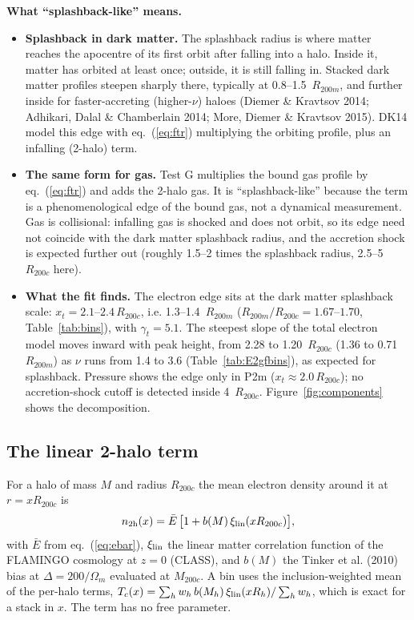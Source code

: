 \documentclass[10pt,a4paper]{article}
\newcommand{\Rc}{R_{200c}}
\newcommand{\ntwo}{n_{\rm 2h}}
\begin{document}
\textbf{What ``splashback-like'' means.}
\begin{itemize}
\item \textbf{Splashback in dark matter.} The splashback radius is where matter reaches the apocentre of its first orbit
  after falling into a halo. Inside it, matter has orbited at least once; outside, it is still falling in. Stacked dark
  matter profiles steepen sharply there, typically at 0.8--1.5~$R_{200m}$, and further inside for faster-accreting
  (higher-$\nu$) haloes (Diemer \& Kravtsov 2014; Adhikari, Dalal \& Chamberlain 2014; More, Diemer \& Kravtsov 2015).
  DK14 model this edge with eq.~(\ref{eq:ftr}) multiplying the orbiting profile, plus an infalling (2-halo) term.
\item \textbf{The same form for gas.} Test G multiplies the bound gas profile by eq.~(\ref{eq:ftr}) and adds the 2-halo gas.
  It is ``splashback-like'' because the term is a phenomenological edge of the bound gas, not a dynamical measurement.
  Gas is collisional: infalling gas is shocked and does not orbit, so its edge need not coincide with the dark matter
  splashback radius, and the accretion shock is expected further out (roughly 1.5--2 times the splashback radius,
  2.5--5~$\Rc$ here).
\item \textbf{What the fit finds.} The electron edge sits at the dark matter splashback scale: $x_t=2.1$--$2.4\,\Rc$, i.e.
  1.3--1.4~$R_{200m}$ ($R_{200m}/\Rc=1.67$--$1.70$, Table~\ref{tab:bins}), with $\gamma_t=5.1$. The steepest slope of the
  total electron model moves inward with peak height, from 2.28 to 1.20~$\Rc$ (1.36 to 0.71~$R_{200m}$) as $\nu$ runs
  from 1.4 to 3.6 (Table~\ref{tab:E2gfbins}), as expected for splashback. Pressure shows the edge only in P2m ($x_t\approx2.0\,\Rc$); no accretion-shock cutoff is
  detected inside 4~$\Rc$. Figure~\ref{fig:components} shows the decomposition.
\end{itemize}

\subsection{The linear 2-halo term}
For a halo of mass $M$ and radius $\Rc$ the mean electron density around it at $r=x\Rc$ is
\begin{equation}
\ntwo(x)=\bar E\,\bigl[1+b(M)\,\xi_{\rm lin}(x\Rc)\bigr], \label{eq:n2h}
\end{equation}
with $\bar E$ from eq.~(\ref{eq:ebar}), $\xi_{\rm lin}$ the linear matter correlation function of the FLAMINGO cosmology at
$z=0$ (CLASS), and $b(M)$ the Tinker et al. (2010) bias at $\Delta=200/\Omega_m$ evaluated at $M_{200c}$. A bin uses the
inclusion-weighted mean of the per-halo terms, $T_c(x)=\sum_h w_h\,b(M_h)\,\xi_{\rm lin}(x R_h)/\sum_h w_h$, which is exact
for a stack in $x$. The term has no free parameter.
\end{document}
